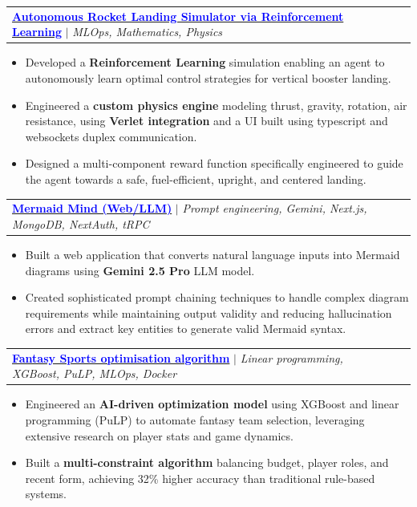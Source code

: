 \documentclass[a4paper,11pt]{article}
\makeatletter
\newcommand{\resumeItem}[1]{
  \item\small{
    {#1 \vspace{-2pt}}
  }
}
\newcommand{\resumeProjectHeading}[2]{
    \item
    \begin{tabular*}{0.97\textwidth}{l@{\extracolsep{\fill}}r}
      \small#1 & #2 \\
    \end{tabular*}\vspace{-7pt}
}
\newcommand{\resumeItemListStart}{\begin{itemize}}
\newcommand{\resumeItemListEnd}{\end{itemize}\vspace{-5pt}}
\makeatother
\begin{document}
    \resumeProjectHeading
    {\href{https://github.com/adimail/rocket-landing-rl}{\textbf{\textcolor{blue}{Autonomous Rocket Landing Simulator via Reinforcement Learning}}} $|$ \footnotesize\emph{MLOps, Mathematics, Physics}}{}
    \resumeItemListStart
        \resumeItem{Developed a \textbf{Reinforcement Learning} simulation enabling an agent to autonomously learn optimal control strategies for vertical booster landing.}
        \resumeItem{Engineered a \textbf{custom physics engine} modeling thrust, gravity, rotation, air resistance, using \textbf{Verlet integration} and a UI built using typescript and websockets duplex communication.}
        \resumeItem{Designed a multi-component reward function specifically engineered to guide the agent towards a safe, fuel-efficient, upright, and centered landing.}
    \resumeItemListEnd

    \resumeProjectHeading
    {\href{https://mermaid-mind.vercel.app/}{\textbf{\textcolor{blue}{Mermaid Mind (Web/LLM)}}} $|$ \footnotesize\emph{Prompt engineering, Gemini, Next.js, MongoDB, NextAuth, tRPC}}{}
    \resumeItemListStart
        \resumeItem{Built a web application that converts natural language inputs into Mermaid diagrams using \textbf{Gemini 2.5 Pro} LLM model.}

        \resumeItem{Created sophisticated prompt chaining techniques to handle complex diagram requirements while maintaining output validity and reducing hallucination errors and extract key entities to generate valid Mermaid syntax.}
    \resumeItemListEnd

    \resumeProjectHeading
    {\href{https://github.com/adimail/fantasy-sports-machine-learning}{\textbf{\textcolor{blue}{Fantasy Sports optimisation algorithm}}} $|$ \footnotesize\emph{Linear programming, XGBoost, PuLP, MLOps, Docker}}{}
    \resumeItemListStart
        \resumeItem{Engineered an \textbf{AI-driven optimization model} using XGBoost and linear programming (PuLP) to automate fantasy team selection, leveraging extensive research on player stats and game dynamics.}
        \resumeItem{Built a \textbf{multi-constraint algorithm} balancing budget, player roles, and recent form, achieving 32\% higher accuracy than traditional rule-based systems.}
    \resumeItemListEnd

\end{document}
